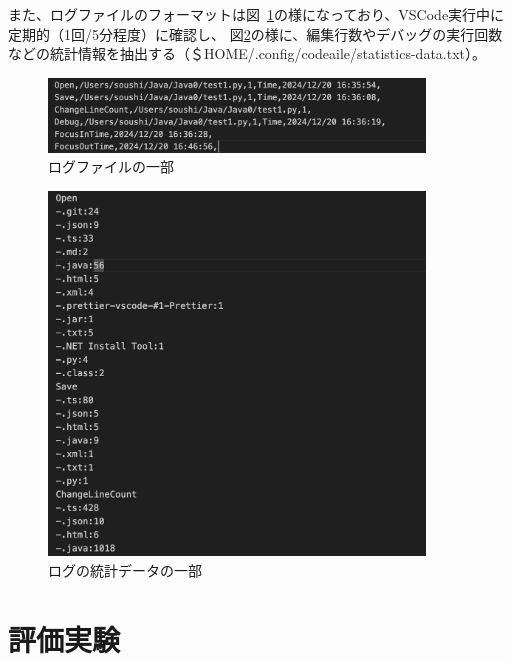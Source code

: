 \documentclass[12pt,twoside]{jbook}
\begin{document}
 また、ログファイルのフォーマットは図~\ref{fig:aileLog}の様になっており、VSCode実行中に定期的（1回/5分程度）に確認し、
図\ref{fig:statistics}の様に、編集行数やデバッグの実行回数などの統計情報を抽出する（＄HOME/.config/codeaile/statistics-data.txt）。

\begin{figure}[tb]
  \centering
  \includegraphics[width=10cm]{images/aileLog}
  \caption{ログファイルの一部}
  \label{fig:aileLog}
\end{figure}

\begin{figure}[tb]
  \centering
  \includegraphics[width=10cm]{images/statistics}
  \caption{ログの統計データの一部}
  \label{fig:statistics}
\end{figure}



\chapter{評価実験}
\end{document}
